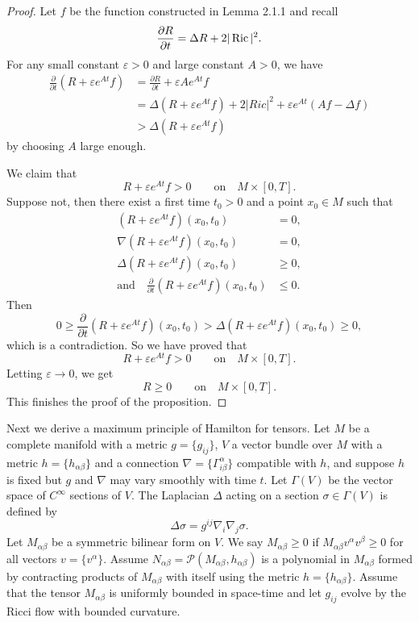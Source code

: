 \begin{proof}
Let $f$ be the function constructed in Lemma 2.1.1 and recall
$$
\frac{\partial R}{\partial t}=\Delta R+2|\operatorname{Ric}|^2.
$$
For any small constant $\varepsilon>0$ and large constant $A>0$,
we have
\begin{align*}
\frac{\partial}{\partial t}(R+\varepsilon e^{At}f)
&  = \frac{\partial R}{\partial t}+\varepsilon Ae^{At}f\\
&  = \Delta(R+\varepsilon e^{At}f)+2|Ric|^2+\varepsilon
e^{At}(Af-\Delta f)\\
& > \Delta(R+\varepsilon e^{At}f)
\end{align*}
by choosing $A$ large enough.

We claim that
$$
R+\varepsilon e^{At}f>0\qquad \text{on}\quad M\times[0,T].
$$
Suppose not, then there exist a first time $t_0>0$ and a point
$x_0\in M$ such that
\begin{align*}
(R+\varepsilon e^{At}f)(x_0,t_0)&=0,\\
\nabla(R+\varepsilon e^{At}f)(x_0,t_0)&=0,\\
\Delta(R+\varepsilon e^{At}f)(x_0,t_0)&\ge 0,\\
\text{and}\quad \frac{\partial}{\partial t}(R+\varepsilon
e^{At}f)(x_0,t_0)&\le 0.
\end{align*}
Then
$$
0\ge \frac{\partial}{\partial t}(R+\varepsilon
e^{At}f)(x_0,t_0)>\Delta(R+\varepsilon e^{At}f)(x_0,t_0)\ge 0,
$$
which is a contradiction. So we have proved that
$$
R+\varepsilon e^{At}f>0\qquad \text{on}\quad M\times[0,T].
$$
Letting $\varepsilon\rightarrow 0$, we get
$$
R\ge 0\qquad \text{on}\quad M\times[0,T].
$$
This finishes the proof of the proposition.
\end{proof}

Next we derive a maximum principle of Hamilton for tensors. Let
$M$ be a complete manifold with a metric $g=\{g_{ij}\}$, $V$ a
vector bundle over $M$ with a metric $h=\{h_{\alpha\beta}\}$ and a
connection $\nabla=\{\Gamma^\alpha_{i\beta}\}$ compatible with
$h$, and suppose $h$ is fixed but $g$ and $\nabla$ may vary
smoothly with time $t$. Let $\Gamma(V)$ be the vector space of
$C^\infty$ sections of $V$. The Laplacian $\Delta$ acting on a
section $\sigma\in\Gamma(V)$ is defined by
$$
\Delta\sigma=g^{ij}\nabla_i\nabla_j\sigma.
$$
Let $M_{\alpha\beta}$ be a symmetric bilinear form on $V$. We say
$M_{\alpha\beta}\ge 0$ if $M_{\alpha\beta}v^\alpha v^\beta\ge 0$
for all vectors $v=\{v^\alpha\}$. Assume
$N_{\alpha\beta}={\mathcal{P}}(M_{\alpha\beta},h_{\alpha\beta})$
is a polynomial in $M_{\alpha\beta}$ formed by contracting
products of $M_{\alpha\beta}$ with itself using the metric
$h=\{h_{\alpha\beta}\}$. Assume that the tensor $M_{\alpha\beta}$
is uniformly bounded in space-time and let $g_{ij}$ evolve by the
Ricci flow with bounded curvature.

